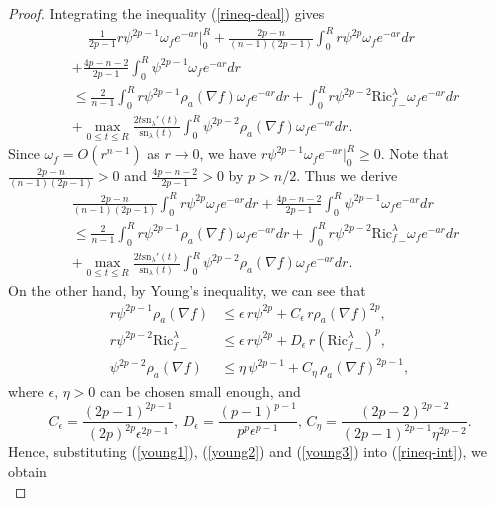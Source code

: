 \documentclass[10pt,a4paper]{amsart}
\newcommand{\sn}{\mathrm{sn}}
\begin{document}
\begin{proof}
	Integrating the inequality (\ref{rineq-deal}) gives
	\begin{align*}
		&\quad\,\frac{1}{2p-1}r\psi^{2p-1}\omega_fe^{-ar}\bigg|_0^R+\frac{2p-n}{(n-1)(2p-1)}\int_{0}^{R}r\psi^{2p}\omega_fe^{-ar}dr\\
		&+\frac{4p-n-2}{2p-1}\int_0^R\psi^{2p-1}\omega_fe^{-ar}dr\\
		&\leq \frac{2}{n-1}\int_{0}^Rr\psi^{2p-1}\rho_a(\nabla f)\omega_fe^{-ar}dr+\int_{0}^Rr\psi^{2p-2}{\mathrm{Ric}^\lambda_f}_-\omega_fe^{-ar}dr\\
		&+\max_{0\leq t\leq R}\frac{2t\sn_\lambda'(t)}{\sn_\lambda(t)}\int_{0}^R\psi^{2p-2}\rho_a(\nabla f)\omega_fe^{-ar}dr.
	\end{align*}
	Since $\omega_f=O(r^{n-1})$ as $r\to 0$, we have
	$r\psi^{2p-1}\omega_fe^{-ar}\big|_0^R\geq 0$.  Note that
	$\frac{2p-n}{(n-1)(2p-1)}>0$ and $\frac{4p-n-2}{2p-1}>0$ by $p>n/2$.  Thus  we derive
	\begin{equation}
		\begin{aligned}
			&\frac{2p-n}{(n-1)(2p-1)}\int_{0}^{R}r\psi^{2p}\omega_fe^{-ar}dr+\frac{4p-n-2}{2p-1}\int_0^R\psi^{2p-1}\omega_fe^{-ar}dr\\
			&\leq \frac{2}{n-1}\int_{0}^Rr\psi^{2p-1}\rho_a(\nabla f)\omega_fe^{-ar}dr+\int_{0}^Rr\psi^{2p-2}{\mathrm{Ric}^\lambda_f}_-\omega_fe^{-ar}dr\\
			&+\max_{0\leq t\leq R}\frac{2t\sn_\lambda'(t)}{\sn_\lambda(t)}\int_{0}^R\psi^{2p-2}\rho_a(\nabla f)\omega_fe^{-ar}dr.
		\end{aligned}
		\label{rineq-int}
	\end{equation}
	On the other hand, by Young's inequality, we can see that
	\begin{align}
		r\psi^{2p-1}\rho_a(\nabla f)&\leq \epsilon\,r \psi^{2p}+C_\epsilon\,r\rho_a(\nabla f)^{2p} ,\label{young1}\\
		r\psi^{2p-2}{\mathrm{Ric}_f^\lambda}_-&\leq \epsilon\,
		r\psi^{2p}+D_\epsilon\,r({\mathrm{Ric}_f^\lambda}_-)^p ,\label{young2}\\
		\psi^{2p-2}\rho_a(\nabla f) &\leq \eta\, \psi^{2p-1}+C_\eta\,\rho_a(\nabla f)^{2p-1},\label{young3}
	\end{align}
	where $\epsilon,\,\eta >0$ can be chosen small enough, and
	\[
	C_\epsilon=\frac{(2p-1)^{2p-1}}{(2p)^{2p}\epsilon^{2p-1}},\, D_\epsilon=\frac{(p-1)^{p-1}}{p^p\epsilon^{p-1}},\, C_\eta=\frac{(2p-2)^{2p-2}}{(2p-1)^{2p-1}\eta^{2p-2}}.
	\]
	Hence, substituting (\ref{young1}), (\ref{young2}) and (\ref{young3}) into (\ref{rineq-int}), we obtain
	\begin{equation*}

\end{equation*}
\end{proof}
\end{document}
